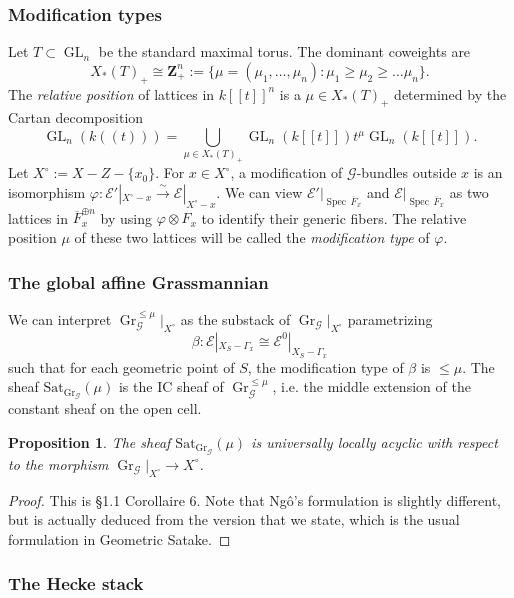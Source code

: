\documentclass[reqno]{amsart}
\numberwithin{equation}{section}
\newcommand{\Z}{\mathbf{Z}}
\newcommand{\ol}[1]{\overline{#1}}
\newcommand{\Cal}[1]{\mathcal{#1}}
\newcommand{\co}{\colon}
\newcommand{\mrm}[1]{\mathrm{#1}}
\newcommand{\cX}{X^{\circ}}
\DeclareMathOperator{\GL}{GL}
\DeclareMathOperator{\Spec}{Spec\,}
\DeclareMathOperator{\Gr}{Gr}
\newtheorem{prop}[thm]{Proposition}
\theoremstyle{remark}
\numberwithin{equation}{section}
\begin{document}
\subsubsection{Modification types}
 Let $T \subset \GL_n$ be the standard maximal torus. The dominant coweights are 
\[
 X_*(T)_+ \cong \Z^n_+ := \{ \mu = (\mu_1, \ldots,\mu_n) \co \mu_1 \geq \mu_2 \geq \ldots \mu_n\}.
\]
The \emph{relative position} of lattices in $k[[t]]^n$ is a $\mu \in  X_*(T)_+$ determined by the Cartan decomposition 
\[
\GL_n(k((t))) = \bigcup_{\mu \in  X_*(T)_+} \GL_n(k[[t]]) t^{\mu}  \GL_n(k[[t]]).
\]
Let $\cX :=  X-Z-\{x_0\}$. For $x \in \cX$, a modification of $\Cal{G}$-bundles outside $x$ is an isomorphism $\varphi \co \Cal{E}'|_{\cX-x} \xrightarrow{\sim} \Cal{E}|_{\cX-x}$. We can view $\Cal{E}'|_{\Spec \ol{F}_x}$ and $\Cal{E}|_{\Spec \ol{F}_x}$ as two lattices in $\ol{F}_x^{\oplus  n}$ by using $\varphi \otimes F_x$ to identify their generic fibers. The relative position $\mu$ of these two lattices will be called the \emph{modification type} of $\varphi$. 

\subsubsection{The global affine Grassmannian}

We can interpret $\Gr_{\Cal{G}}^{\leq \mu}|_{\cX}$ as the substack of $\Gr_{\Cal{G}}|_{\cX}$ parametrizing
\[
 \beta \co \Cal{E}|_{X_S - \Gamma_x} \cong \Cal{E}^0 |_{X_S-\Gamma_x} 
 \]
 such that for each geometric point of $S$, the modification type of $\beta$ is $\leq \mu$. The sheaf $\mrm{Sat}_{\Gr_{\Cal{G}}}(\mu)$ is the IC sheaf of $\Gr_{\Cal{G}}^{\leq \mu}$, i.e. the middle extension of the constant sheaf on the open cell. 
 
 \begin{prop}\label{prop: gr sat ula}
 The sheaf $\mrm{Sat}_{\Gr_{\Cal{G}}}(\mu)$ is universally locally acyclic with respect to the morphism $\Gr_{\Cal{G}}|_{\cX} \rightarrow \cX$. 
 \end{prop}
 
\begin{proof}
This is \cite{Ngo06} \S 1.1 Corollaire 6. Note that Ng\^{o}'s formulation is slightly different, but is actually deduced from the version that we state, which is the usual formulation in Geometric Satake. 
\end{proof}

\subsubsection{The Hecke stack}
\end{document}
